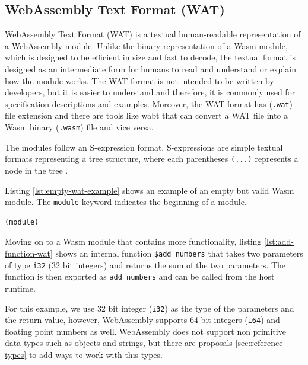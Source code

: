 \subsection{WebAssembly Text Format (WAT)}
\label{subsec:wasm-text-format}

WebAssembly Text Format (WAT) \cite{webassemblycommunitygroup_2023_webassembly} is a textual human-readable representation of a \gls{WebAssembly} module. Unlike the binary representation of a Wasm module, which is designed to be efficient in size and fast to decode, the textual format is designed as an intermediate form for humans to read and understand or explain how the module works. The WAT format is not intended to be written by developers, but it is easier to understand and therefore, it is commonly used for specification descriptions and examples. Moreover, the WAT format has (\texttt{.wat}) file extension and there are tools like wabt\cite{webassembly_2020_webassemblywabt} that can convert a WAT file into a Wasm binary (\texttt{.wasm}) file and vice versa.

The modules follow an S-expression format. S-expressions are simple textual formats representing a tree structure, where each parentheses \texttt{(...)} represents a node in the tree \cite{mozillacorporation_2023_understanding}. 

Listing \ref{lst:empty-wat-example} shows an example of an empty but valid Wasm module. The \texttt{module} keyword indicates the beginning of a module.
%
\begin{lstlisting}[frame=lines, style=Wasm, caption={A WAT file containing an empty module}, showstringspaces=false, captionpos=b, label={lst:empty-wat-example}]
(module)
\end{lstlisting}
%
Moving on to a Wasm module that contains more functionality, listing \ref{lst:add-function-wat} shows an internal function \texttt{\$add\_numbers} that takes two parameters of type \texttt{i32} (32 bit integers) and returns the sum of the two parameters. The function is then exported as \texttt{add\_numbers} and can be called from the host runtime. 

For this example, we use 32 bit integer (\texttt{i32}) as the type of the parameters and the return value, however, WebAssembly supports 64 bit integers (\texttt{i64}) and floating point numbers as well. WebAssembly does not support non primitive data types such as objects and strings, but there are proposals \ref{sec:reference-types} to add ways to work with this types.

